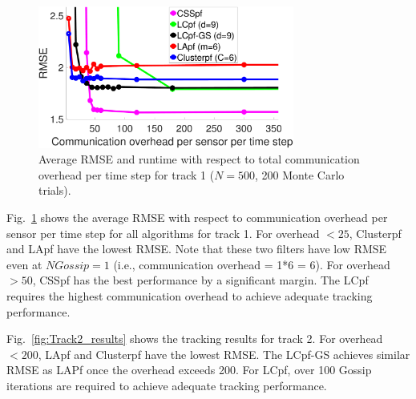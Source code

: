 \documentclass[10pt,letterpaper,final]{article}
\begin{document}
\begin{figure}
\centering
\includegraphics[width=0.75\textwidth]{Figures/Track1_bearing_RMSE}
\caption{Average RMSE and runtime with respect to total communication overhead per time step for track 1 ($N=500$, 200 Monte Carlo trials).}
\label{fig:Track1_results}
\end{figure}


Fig.~\ref{fig:Track1_results} shows the average RMSE with respect to communication overhead per sensor per time step for all algorithms for track 1. For overhead $< 25$, Clusterpf and LApf have the lowest RMSE. Note that these two filters have low RMSE even at $NGossip=1$ (i.e., communication overhead = 1*6 = 6). For overhead $> 50$, CSSpf has the best performance by a significant margin. The LCpf requires the highest communication overhead to achieve adequate tracking performance.

Fig.~\ref{fig:Track2_results} shows the tracking results for track 2. For overhead $< 200$, LApf and Clusterpf have the lowest RMSE. The LCpf-GS achieves similar RMSE as LAPf once the overhead exceeds 200. For LCpf, over 100 Gossip iterations are required to achieve adequate tracking performance. 
\end{document}
